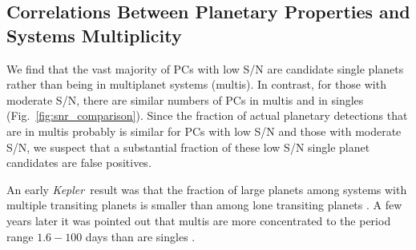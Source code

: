 \documentclass{aastex62}
\newcommand{\ik}{{\it Kepler~}}
\begin{document}
\subsection{Correlations Between Planetary Properties and Systems Multiplicity}  \label{sec:Mconclusions}

We find that the vast majority of PCs with low S/N are candidate single planets rather than being in multiplanet systems (multis).  In contrast, for those with moderate S/N, there are similar numbers of PCs in multis and in singles (Fig.~\ref{fig:snr_comparison}). Since the fraction of actual planetary detections that are in multis probably is similar for PCs with low S/N and those with moderate S/N, we suspect that a substantial fraction of these low S/N single planet candidates are false positives. %

An early \ik result was that the fraction of large planets among systems with multiple transiting planets is smaller than among lone transiting planets \citep{Latham:2011}. A few years later it was pointed out that  multis are more concentrated to the period range $1.6-100$ days than are singles \citep{Lissauer:2014,Rowe:2014}.   
\end{document}
